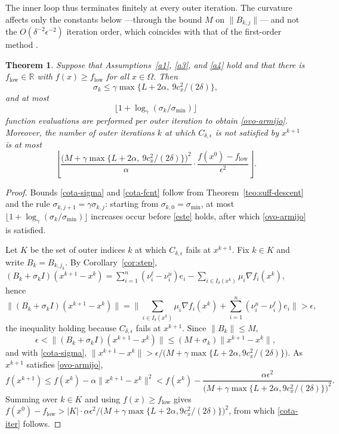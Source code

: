 \documentclass[11pt]{article}
\newcommand{\flow}{f_{\mathrm{low}}}
\newtheorem{theorem}{Theorem}[section]
\begin{document}
The inner loop thus terminates finitely at every outer iteration. The curvature
affects only the constants below ---through the bound $M$ on $\|B_{k,j}\|$--- and
not the $O(\delta^{-2}\epsilon^{-2})$ iteration order, which coincides with that
of the first-order method \cite{alvarezovo}.

\begin{theorem} \label{teo:complexity}
Suppose that Assumptions~\ref{a1}, \ref{a3}, and \ref{a4} hold and that there is
$\flow \in \mathbb{R}$ with $f(x) \geq \flow$ for all $x \in \Omega$. Then
\begin{equation} \label{cota-sigma}
\sigma_k \leq \gamma \max\{ L + 2\alpha,\ 9c_x^2/(2\delta) \},
\end{equation}
and at most
\begin{equation} \label{cota-fcnt}
\big\lfloor 1 + \log_\gamma( \sigma_k / \sigma_{\min} ) \big\rfloor
\end{equation}
function evaluations are performed per outer iteration to obtain
\eqref{ovo-armijo}. Moreover, the number of outer iterations $k$ at which
$C_{\delta,\epsilon}$ is not satisfied by $x^{k+1}$ is at most
\begin{equation} \label{cota-iter}
\left\lfloor \frac{\big( M + \gamma \max\{ L + 2\alpha,\ 9c_x^2/(2\delta) \}
\big)^2}{\alpha} \cdot \frac{f(x^0) - \flow}{\epsilon^2} \right\rfloor.
\end{equation}
\end{theorem}

\begin{proof}
Bounds \eqref{cota-sigma} and \eqref{cota-fcnt} follow from
Theorem~\ref{teo:suff-descent} and the rule
$\sigma_{k,j+1} = \gamma\sigma_{k,j}$: starting from
$\sigma_{k,0} = \sigma_{\min}$, at most
$\lfloor 1 + \log_\gamma(\sigma_k/\sigma_{\min}) \rfloor$ increases occur before
\eqref{este} holds, after which \eqref{ovo-armijo} is satisfied.

Let $K$ be the set of outer indices $k$ at which $C_{\delta,\epsilon}$ fails at
$x^{k+1}$. Fix $k \in K$ and write $B_k = B_{k,j_k}$. By
Corollary~\ref{cor:step},
$(B_k + \sigma_k I)(x^{k+1} - x^k)
= \sum_{i=1}^n (\nu^\ell_i - \nu^u_i) e_i
- \sum_{i \in I_\delta(x^k)} \mu_i \nabla f_i(x^k)$, hence
\[
\big\| (B_k + \sigma_k I)(x^{k+1} - x^k) \big\|
= \Big\| \sum_{i \in I_\delta(x^k)} \mu_i \nabla f_i(x^k)
+ \sum_{i=1}^n (\nu^u_i - \nu^\ell_i) e_i \Big\| > \epsilon,
\]
the inequality holding because $C_{\delta,\epsilon}$ fails at $x^{k+1}$. Since
$\|B_k\| \leq M$,
\[
\epsilon < \| (B_k + \sigma_k I)(x^{k+1} - x^k) \|
\leq (M + \sigma_k) \|x^{k+1} - x^k\|,
\]
and with \eqref{cota-sigma},
$\|x^{k+1} - x^k\| > \epsilon / \big( M + \gamma\max\{L + 2\alpha, 9c_x^2/(2\delta)\} \big)$.
As $x^{k+1}$ satisfies \eqref{ovo-armijo},
\[
f(x^{k+1}) \leq f(x^k) - \alpha\|x^{k+1} - x^k\|^2
< f(x^k) - \frac{\alpha\epsilon^2}
{\big( M + \gamma\max\{L + 2\alpha, 9c_x^2/(2\delta)\} \big)^2}.
\]
Summing over $k \in K$ and using $f(x) \geq \flow$ gives
$f(x^0) - \flow > |K| \cdot \alpha\epsilon^2 /
\big( M + \gamma\max\{L + 2\alpha, 9c_x^2/(2\delta)\} \big)^2$, from which
\eqref{cota-iter} follows.
\end{proof}
\end{document}
